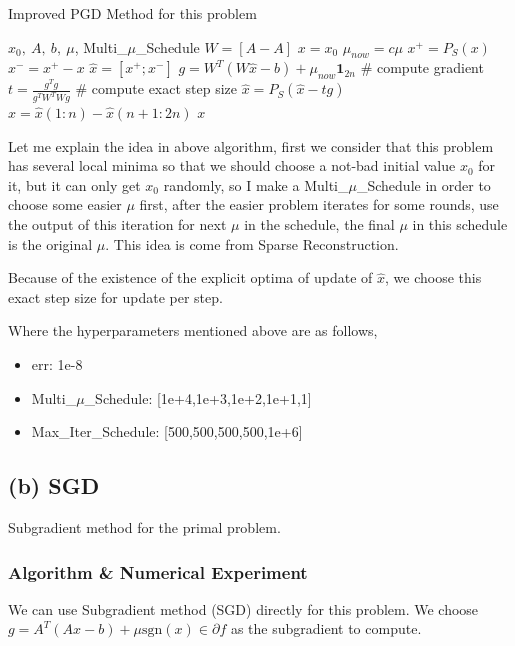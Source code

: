 \documentclass[]{article}
\begin{document}
\begin{algorithm}[!h]
	\caption{Improved PGD Method for this problem}
	\label{ipgd}
	\begin{algorithmic}
		\REQUIRE $x_0, \ A,\  b,\  \mu $, Multi\_$\mu$\_Schedule
		\STATE $W = [A -A]$
		\STATE $x=x_0$
		\STATE $\mu_{now} = c\mu$
		\STATE $x^+ = P_S(x)$   
		\STATE $x^- = x^+-x$   
		\STATE $\hat{x} = [x^+;x^-]$
		\STATE $g = W^T(W\hat{x}-b)+\mu_{now}\mathbf{1}_{2n}$ \# compute gradient
		\STATE $t = \frac{g^Tg}{g^TW^TWg}$ \# compute exact step size
		\STATE $\hat{x}=P_S(\hat{x}-tg)$
		\STATE $x = \hat{x}(1:n)-\hat{x}(n+1:2n)$
		\ENDWHILE
		\ENDFOR
		\ENSURE $x$
	\end{algorithmic}
\end{algorithm}

Let me explain the idea in above algorithm, first we consider that this problem has several local minima so that we should choose a not-bad initial value $x_0$ for it, but it can only get $x_0$ randomly, so I make a Multi\_$\mu$\_Schedule in order to choose some easier $\mu$ first, after the easier problem iterates for some rounds, use the output of this iteration for next $\mu$ in the schedule, the final $\mu$ in this schedule is the original $\mu$. This idea is come from Sparse Reconstruction.

Because of the existence of the explicit optima of update of $\hat{x}$, we choose this exact step size for update per step.

Where the hyperparameters mentioned above are as follows,
\begin{itemize}
	\item err: 1e-8
	\item Multi\_$\mu$\_Schedule: [1e+4,1e+3,1e+2,1e+1,1]
	\item Max\_Iter\_Schedule: [500,500,500,500,1e+6]
\end{itemize}



\subsection{(b) SGD}
\noindent
Subgradient method for the primal problem.

\subsubsection{Algorithm \& Numerical Experiment}

We can use Subgradient method (SGD) directly for this problem. We choose $g = A^T(Ax-b)+\mu \text{sgn}(x) \in \partial f$ as the subgradient to compute.
\end{document}
